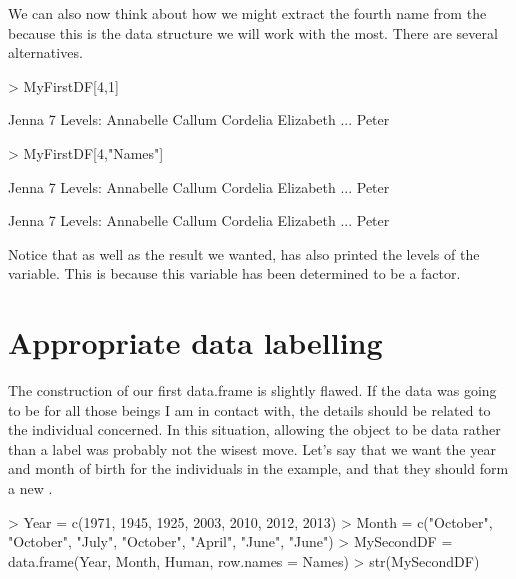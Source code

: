 We can also now think about how we might extract the fourth name from the  because this is the data structure we will work with the most. There are several alternatives. 
\begin{Schunk}
\begin{Sinput}
> MyFirstDF[4,1] 
\end{Sinput}
\begin{Soutput}
[1] Jenna
7 Levels: Annabelle Callum Cordelia Elizabeth ... Peter
\end{Soutput}
\begin{Sinput}
> MyFirstDF[4,"Names"] 
\end{Sinput}
\begin{Soutput}
[1] Jenna
7 Levels: Annabelle Callum Cordelia Elizabeth ... Peter
\end{Soutput}
\begin{Soutput}
[1] Jenna
7 Levels: Annabelle Callum Cordelia Elizabeth ... Peter
\end{Soutput}
\end{Schunk}
 
Notice that as well as the result we wanted, \R{} has also printed the levels of the  variable. This is because this variable has been determined to be a factor. 
 
 
 
\section{Appropriate data labelling} 
 
The construction of our first data.frame is slightly flawed. If the  data was going to be for all those beings I am in contact with, the details should be related to the individual concerned. In this situation, allowing the  object to be data rather than a label was probably not the wisest move. Let's say that we want the year and month of birth for the individuals in the example, and that they should form a new . 
\begin{Schunk}
\begin{Sinput}
> Year = c(1971, 1945, 1925, 2003, 2010, 2012, 2013) 
> Month = c("October", "October", "July", "October", "April", "June", "June") 
> MySecondDF = data.frame(Year, Month, Human, row.names = Names) 
> str(MySecondDF) 
\end{Sinput}
\end{Schunk}
 
